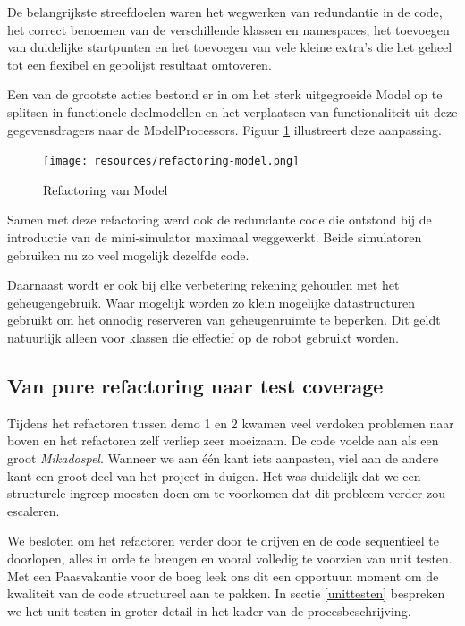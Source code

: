 \documentclass[12pt,a4paper]{report}
\begin{document}
De belangrijkste streefdoelen waren het wegwerken van redundantie in de code, het correct benoemen van de verschillende klassen en namespaces, het toevoegen van duidelijke startpunten en het toevoegen van vele kleine extra's die het geheel tot een flexibel en gepolijst resultaat omtoveren.

Een van de grootste acties bestond er in om het sterk uitgegroeide Model op te splitsen in functionele deelmodellen en het verplaatsen van functionaliteit uit deze gegevensdragers naar de ModelProcessors. Figuur \ref{uml:refactoring} illustreert deze aanpassing.

\begin{figure}[htbp]
  \centering
  \texttt{[image: resources/refactoring-model.png]}
  \caption{Refactoring van Model}
  \label{uml:refactoring}
\end{figure}

Samen met deze refactoring werd ook de redundante code die ontstond bij de introductie van de mini-simulator maximaal weggewerkt. Beide simulatoren gebruiken nu zo veel mogelijk dezelfde code.

Daarnaast wordt er ook bij elke verbetering rekening gehouden met het geheugengebruik. Waar mogelijk worden zo klein mogelijke datastructuren gebruikt om het onnodig reserveren van geheugenruimte te beperken. Dit geldt natuurlijk alleen voor klassen die effectief op de robot gebruikt worden.

\subsection{Van pure refactoring naar test coverage}

Tijdens het refactoren tussen demo 1 en 2 kwamen veel verdoken problemen naar boven en het refactoren zelf verliep zeer moeizaam. De code voelde aan als een groot \emph{Mikadospel}. Wanneer we aan \'e\'en kant iets aanpasten, viel aan de andere kant een groot deel van het project in duigen. Het was duidelijk dat we een structurele ingreep moesten doen om te voorkomen dat dit probleem verder zou escaleren.

We besloten om het refactoren verder door te drijven en de code sequentieel te doorlopen, alles in orde te brengen en vooral volledig te voorzien van unit testen. Met een Paasvakantie voor de boeg leek ons dit een opportuun moment om de kwaliteit van de code structureel aan te pakken.
In sectie \ref{unittesten} bespreken we het unit testen in groter detail in het kader van de procesbeschrijving.
\end{document}
